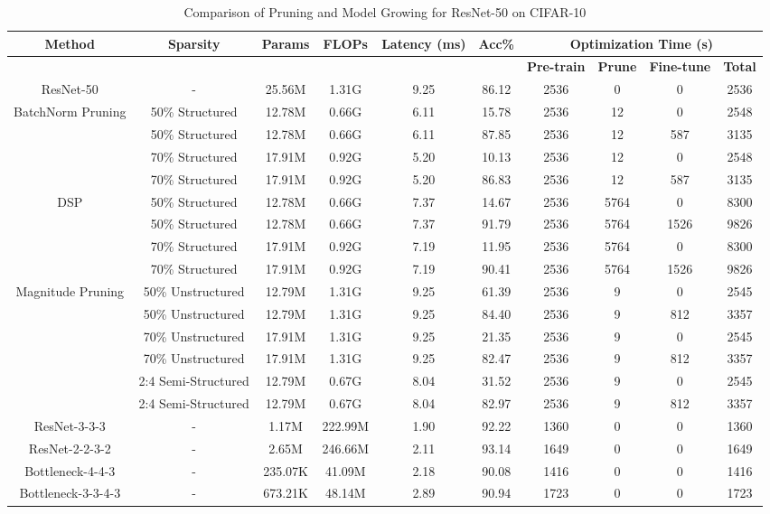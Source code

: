 \documentclass[preprint,12pt]{elsarticle}
\begin{document}
\begin{table}[ht]
\centering
\tiny
\renewcommand{\arraystretch}{1.3}
\begin{adjustbox}{center}
\begin{tabular}{c|c|c|c|c|c|c|c|c|c}
\hline
\textbf{Method} & \textbf{Sparsity} & \textbf{Params} & \textbf{FLOPs} & \textbf{Latency (ms)} & \textbf{Acc\%} & \multicolumn{4}{c}{\textbf{Optimization Time (s)}} \\
\hline
\textbf{} & \textbf{} & \textbf{} & \textbf{} & \textbf{} & \textbf{} & \textbf{Pre-train} & \textbf{Prune} & \textbf{Fine-tune} & \textbf{Total} \\
\hline
ResNet-50 & - & 25.56M & 1.31G & 9.25 & 86.12 & 2536 & 0 & 0 & 2536 \\
\hline
BatchNorm Pruning & 50\% Structured & 12.78M & 0.66G & 6.11 & 15.78 & 2536 & 12 & 0 & 2548 \\
 & 50\% Structured & 12.78M & 0.66G & 6.11 & 87.85 & 2536 & 12 & 587 & 3135 \\
 & 70\% Structured & 17.91M & 0.92G & 5.20 & 10.13 & 2536 & 12 & 0 & 2548 \\
 & 70\% Structured & 17.91M & 0.92G & 5.20 & 86.83 & 2536 & 12 & 587 & 3135 \\
\hline
DSP & 50\% Structured & 12.78M & 0.66G & 7.37 & 14.67 & 2536 & 5764 & 0 & 8300 \\
 & 50\% Structured & 12.78M & 0.66G & 7.37 & 91.79 & 2536 & 5764 & 1526 & 9826 \\
 & 70\% Structured & 17.91M & 0.92G & 7.19 & 11.95 & 2536 & 5764 & 0 & 8300 \\
 & 70\% Structured & 17.91M & 0.92G & 7.19 & 90.41 & 2536 & 5764 & 1526 & 9826 \\
\hline
Magnitude Pruning & 50\% Unstructured & 12.79M & 1.31G & 9.25 & 61.39 & 2536 & 9 & 0 & 2545 \\
 & 50\% Unstructured & 12.79M & 1.31G & 9.25 & 84.40 & 2536 & 9 & 812 & 3357 \\
 & 70\% Unstructured & 17.91M & 1.31G & 9.25 & 21.35 & 2536 & 9 & 0 & 2545 \\
 & 70\% Unstructured & 17.91M & 1.31G & 9.25 & 82.47 & 2536 & 9 & 812 & 3357 \\
 & 2:4 Semi-Structured & 12.79M & 0.67G & 8.04 & 31.52 & 2536 & 9 & 0 & 2545 \\
 & 2:4 Semi-Structured & 12.79M & 0.67G & 8.04 & 82.97 & 2536 & 9 & 812 & 3357 \\
\hline
ResNet-3-3-3 & - & 1.17M & 222.99M & 1.90 & 92.22 & 1360 & 0 & 0 & 1360 \\
ResNet-2-2-3-2 & - & 2.65M & 246.66M & 2.11 & 93.14 & 1649 & 0 & 0 & 1649 \\
Bottleneck-4-4-3 & - & 235.07K & 41.09M & 2.18 & 90.08 & 1416 & 0 & 0 & 1416 \\
Bottleneck-3-3-4-3 & - & 673.21K & 48.14M & 2.89 & 90.94 & 1723 & 0 & 0 & 1723 \\
\hline
\end{tabular}
\end{adjustbox}
\caption{Comparison of Pruning and Model Growing for ResNet-50 on CIFAR-10}
\label{table:pruning_vs_growth}
\end{table}
\end{document}
